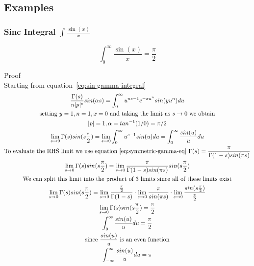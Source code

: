 \documentclass[a4paper]{article}
\begin{document}
    \subsection{Examples}\label{subsec:examples}

    \subsubsection{Sinc Integral $\int \frac{\sin(x)}{x}$}

    \begin{theorem}
        \begin{equation}
            \boxed{
                \int_{0}^{\infty} \frac{\sin(x)}{x} = \frac{\pi}{2}
            }\label{eq:equation18}
        \end{equation}

        Proof
        \\
        Starting from equation~\ref{eq:sin-gamma-integral}
        \begin{gather*}
            \frac{\Gamma(s)}{n |p|^s} sin(\alpha s)= \int_{0}^{\infty} u^{ns -1} e^{-x u^{n}} sin(y u^n) du
            \\
            \text{setting $y=1, n=1, x=0$ and taking the limit as $s \to 0$ we obtain}
            \\
            |p| = 1, \alpha = tan^{-1}(1/0) = \pi/2
            \\
            \lim_{s \to 0} \Gamma(s) sin(s \frac{\pi}{2})= \lim_{s \to 0} \int_{0}^{\infty} u^{s -1} sin(u) du  = \int_{0}^{\infty} \frac{sin(u)}{u} du
            \\
            \text{To evaluate the RHS limit we use equation~\ref{eq:symmetric-gamma-eq}  } \Gamma(s) = \frac{\pi}{\Gamma(1-s)sin(\pi s)}
            \\
            \lim_{s \to 0} \Gamma(s) sin(s \frac{\pi}{2})= \lim_{s \to 0} \frac{\pi}{\Gamma(1-s)sin(\pi s)} sin(s \frac{\pi}{2})
            \\
            \text{We can split this limit into the product of 3 limits since all of these limits exist}
            \\
            \lim_{s \to 0} \Gamma(s) sin(s \frac{\pi}{2})= \lim_{s \to 0}  \frac{\frac{\pi}{2}}{\Gamma(1-s)} \cdot
            \lim_{s \to 0}
            \frac{\pi}{sin(\pi s)}
            \cdot
            \lim_{s \to 0}
            \frac{sin(s \frac{\pi}{2})}{\frac{\pi}{2}}
            \\
            \lim_{s \to 0} \Gamma(s) sin(s \frac{\pi}{2})= \frac{\pi}{2}
            \\
            \int_{0}^{\infty} \frac{sin(u)}{u} du = \frac{\pi}{2}
            \\
            \text{since } \frac{sin(u)}{u} \text{ is an even function}
            \\
            \int_{-\infty}^{\infty} \frac{sin(u)}{u} du = \pi
        \end{gather*}
    \end{theorem}
\end{document}
